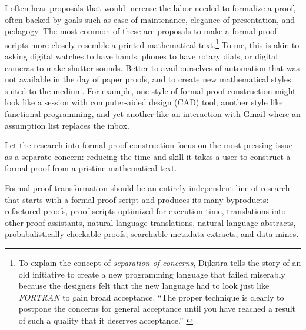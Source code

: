 \documentclass{llncs}
\begin{document}
I often hear proposals that would increase the labor needed to
formalize a proof, often backed by goals such as ease of maintenance,
elegance of presentation, and pedagogy.  The most common of these are
proposals to make a formal proof scripts more closely resemble a
printed mathematical text.\footnote{To explain the concept of {\it
    separation of concerns}, Dijkstra tells the story of an old
  initiative to create a new programming language that failed
  miserably because the designers felt that the new language had to
  look just like {\it FORTRAN} to gain broad acceptance. ``The proper
  technique is clearly to postpone the concerns for general acceptance
  until you have reached a result of such a quality that it deserves
  acceptance.'' \cite{XX}} %
 To me, this is
akin to asking digital watches to have hands, phones to have rotary
dials, or digital cameras to make shutter sounds.  Better to avail
ourselves of automation that was not available in the day of paper
proofs, and to create new mathematical styles suited to the medium.
For example, one style of formal proof construction might look like a
session with computer-aided design (CAD) tool, another style like
functional programming, and yet another like an interaction with Gmail
where an assumption list replaces the inbox.


Let the research into formal proof construction focus on the most
pressing issue as a separate concern: reducing the time and skill it
takes a user to construct a formal proof from a pristine mathematical
text.

Formal proof transformation should be an entirely independent line of
research that starts with a formal proof script and produces its many
byproducts: refactored proofs, proof scripts optimized for execution
time, translations into other proof assistants, natural language 
translations, natural language abstracts, probabalistically checkable
proofs, searchable metadata extracts, and data mines.




\end{document}
